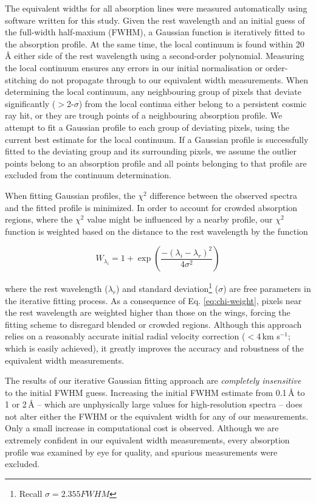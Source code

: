 \documentclass{emulateapj}
\begin{document}
The equivalent widths for all absorption lines were measured automatically using software written for this study. Given the rest wavelength and an initial guess of the full-width half-maxium (FWHM), a Gaussian function is iteratively fitted to the absorption profile. At the same time, the local continuum is found within 20\,\AA{} either side of the rest wavelength using a second-order polynomial. Measuring the local continuum ensures any errors in our initial normalisation or order-stitching do not propagate through to our equivalent width measurements. When determining the local continuum, any neighbouring group of pixels that deviate significantly ($>$2-$\sigma$) from the local continua either belong to a persistent cosmic ray hit, or they are trough points of a neighbouring absorption profile. We attempt to fit a Gaussian profile to each group of deviating pixels, using the current best estimate for the local continuum. If a Gaussian profile is successfully fitted to the deviating group and its surrounding pixels, we assume the outlier points belong to an absorption profile and all points belonging to that profile are excluded from the continuum determination. 

When fitting Gaussian profiles, the $\chi^2$ difference between the observed spectra and the fitted profile is minimized. In order to account for crowded absorption regions, where the $\chi^2$ value might be influenced by a nearby profile, our $\chi^2$ function is weighted based on the distance to the rest wavelength by the function

\begin{equation}
W_{\lambda_{i}} = 1 + \exp{\left(\frac{-(\lambda_{i} - \lambda_{r})^2}{4\sigma^2}\right)}
\label{eq:chi-weight}
\end{equation}

\noindent where the rest wavelength ($\lambda_{r}$) and standard deviation\footnote{Recall $\sigma = 2.355FWHM$} ($\sigma$) are free parameters in the iterative fitting process. As a consequence of Eq. \ref{eq:chi-weight}, pixels near the rest wavelength are weighted higher than those on the wings, forcing the fitting scheme to disregard blended or crowded regions. Although this approach relies on a reasonably accurate initial radial velocity correction ($<$4\,km s$^{-1}$; which is easily achieved), it greatly improves the accuracy and robustness of the equivalent width measurements.

The results of our iterative Gaussian fitting approach are \textit{completely insensitive} to the initial FWHM guess. Increasing the initial FWHM estimate from 0.1\,\AA{} to 1 or 2\,\AA{} -- which are unphysically large values for high-resolution spectra -- does not alter either the FWHM or the equivalent width for any of our measurements. Only a small increase in computational cost is observed. Although we are extremely confident in our equivalent width measurements, every absorption profile was examined by eye for quality, and spurious measurements were excluded.
\end{document}
